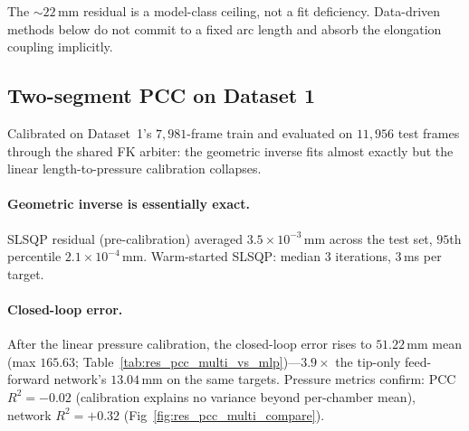 The ${\sim}22$\,mm residual is a model-class ceiling, not a fit deficiency. Data-driven methods below do not commit to a fixed arc length and absorb the elongation coupling implicitly.

\subsection{Two-segment PCC on Dataset 1}
\label{sec:res_pcc_multi}

Calibrated on Dataset~1's $7{,}981$-frame train and evaluated on $11{,}956$ test frames through the shared FK arbiter: the geometric inverse fits almost exactly but the linear length-to-pressure calibration collapses.

\paragraph{Geometric inverse is essentially exact.}
SLSQP residual (pre-calibration) averaged $3.5 \times 10^{-3}$\,mm across the test set, $95$th percentile $2.1 \times 10^{-4}$\,mm. Warm-started SLSQP: median $3$ iterations, $3$\,ms per target.

\paragraph{Closed-loop error.}
After the linear pressure calibration, the closed-loop error rises to $51.22$\,mm mean (max $165.63$; Table~\ref{tab:res_pcc_multi_vs_mlp})---$3.9\times$ the tip-only feed-forward network's $13.04$\,mm on the same targets. Pressure metrics confirm: PCC $R^{2} = -0.02$ (calibration explains no variance beyond per-chamber mean), network $R^{2} = +0.32$ (Fig~\ref{fig:res_pcc_multi_compare}).

